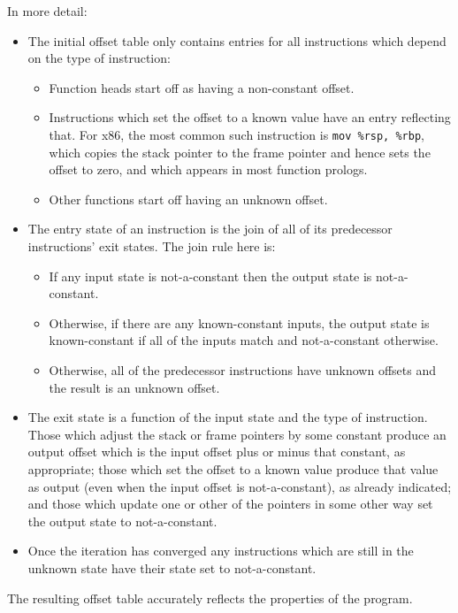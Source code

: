 In more detail:

\begin{itemize}
\item
  The initial offset table only contains entries for all instructions
  which depend on the type of instruction:

  \begin{itemize}
  \item Function heads start off as having a non-constant offset.
  \item Instructions which set the offset to a known value have an
    entry reflecting that.  For x86, the most common such instruction
    is \verb|mov %rsp, %rbp|, which copies the stack pointer to the
    frame pointer and hence sets the offset to zero, and which appears in
    most function prologs.
  \item Other functions start off having an unknown offset.
  \end{itemize}
\item
  The entry state of an instruction is the join of all of its
  predecessor instructions' exit states.  The join rule here
  is:

  \begin{itemize}
  \item
    If any input state is not-a-constant then the output state is
    not-a-constant.
  \item
    Otherwise, if there are any known-constant inputs, the output
    state is known-constant if all of the inputs match and
    not-a-constant otherwise.
  \item
    Otherwise, all of the predecessor instructions have unknown
    offsets and the result is an unknown offset.
  \end{itemize}
\item
  The exit state is a function of the input state and the type of
  instruction.  Those which adjust the stack or frame pointers by some
  constant produce an output offset which is the input offset plus or
  minus that constant, as appropriate; those which set the offset to a
  known value produce that value as output (even when the input offset
  is not-a-constant), as already indicated; and those which update one
  or other of the pointers in some other way set the output state to
  not-a-constant.
\item
  Once the iteration has converged any instructions which are still in
  the unknown state have their state set to not-a-constant.
\end{itemize}

The resulting offset table accurately reflects the properties of the
program.


